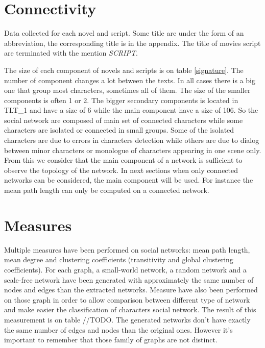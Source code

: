 \documentclass[a4paper, 12pt]{report}
\begin{document}
\section{Connectivity}

\begin{table}[]
\caption{Data collected for each novel and script. Some title are under the form of an abbreviation, the corresponding title
 is in the appendix. The title of movies script are terminated with the mention \textit{SCRIPT}.}
 \label{signature}
\end{table}

The size of each component of novels and scripts is on table \ref{signature}. The number of component changes a lot between the texts. In all cases there is a big one that group most characters, sometimes all of them. The size of the smaller components is often 1 or 2. The bigger secondary components is located in TLT\_1 and have a size of 6 while the main component have a size of 106. So the social network are composed of main set of connected characters while some characters are isolated or connected in small groups. Some of the isolated characters are due to errors in characters detection while others are due to dialog between minor characters or monologue of characters appearing in one scene only. From this we consider that the main component of a network is sufficient to observe the topology of the network. In next sections when only connected networks can be considered, the main component will be used. For instance the mean path length can only be computed on a connected network.


\section{Measures}
Multiple measures have been performed on social networks: mean path length, mean degree and clustering coefficients (transitivity and global clustering coefficients). For each graph, a small-world network, a random network and a scale-free network have been generated with approximately the same number of nodes and edges than the extracted networks. Measure have also been performed on those graph in order to allow comparison between different type of network and make easier the classification of characters social network. The result of this measurement is on table //TODO. The generated networks don't have exactly the same number of edges and nodes than the original ones. However it's important to remember that those family of graphs are not distinct.\\
\end{document}
